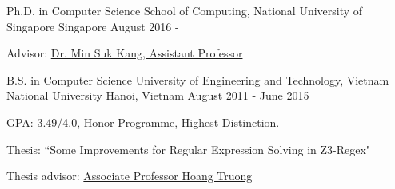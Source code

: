 


\begin{cventries}

  \cventry
    {Ph.D. in Computer Science} %
    {School of Computing, National University of Singapore} %
    {Singapore} %
    {August 2016 - } %
    {
      \begin{cvitems} %
        \item {Advisor: \href{http://www.comp.nus.edu.sg/~kangms/}{Dr. Min Suk Kang, Assistant Professor}}
      \end{cvitems}
    }

  \cventry
    {B.S. in Computer Science} %
    {University of Engineering and Technology, Vietnam National University} %
    {Hanoi, Vietnam} %
    {August 2011 - June 2015} %
    {
      \begin{cvitems} %
        \item {GPA: 3.49/4.0, Honor Programme, Highest Distinction.}
        \item {Thesis: “Some Improvements for Regular Expression Solving in Z3-Regex"}
        \item {Thesis advisor: \href{http://www.uet.vnu.edu.vn/~hoangta/}{Associate Professor Hoang Truong}}
      \end{cvitems}
    }


\end{cventries}
